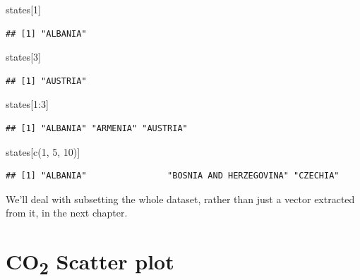 \documentclass[
]{book}
\newenvironment{Shaded}{\begin{snugshade}}{\end{snugshade}}
\newcommand{\DecValTok}[1]{\textcolor[rgb]{0.00,0.00,0.81}{#1}}
\newcommand{\FunctionTok}[1]{\textcolor[rgb]{0.00,0.00,0.00}{#1}}
\newcommand{\NormalTok}[1]{#1}
\newcommand{\SpecialCharTok}[1]{\textcolor[rgb]{0.00,0.00,0.00}{#1}}
\begin{document}
\begin{Shaded}
\begin{Highlighting}[]
\NormalTok{states[}\DecValTok{1}\NormalTok{]}
\end{Highlighting}
\end{Shaded}

\begin{verbatim}
## [1] "ALBANIA"
\end{verbatim}

\begin{Shaded}
\begin{Highlighting}[]
\NormalTok{states[}\DecValTok{3}\NormalTok{]}
\end{Highlighting}
\end{Shaded}

\begin{verbatim}
## [1] "AUSTRIA"
\end{verbatim}

\begin{Shaded}
\begin{Highlighting}[]
\NormalTok{states[}\DecValTok{1}\SpecialCharTok{:}\DecValTok{3}\NormalTok{]}
\end{Highlighting}
\end{Shaded}

\begin{verbatim}
## [1] "ALBANIA" "ARMENIA" "AUSTRIA"
\end{verbatim}

\begin{Shaded}
\begin{Highlighting}[]
\NormalTok{states[}\FunctionTok{c}\NormalTok{(}\DecValTok{1}\NormalTok{, }\DecValTok{5}\NormalTok{, }\DecValTok{10}\NormalTok{)]}
\end{Highlighting}
\end{Shaded}

\begin{verbatim}
## [1] "ALBANIA"                "BOSNIA AND HERZEGOVINA" "CZECHIA"
\end{verbatim}

We'll deal with subsetting the whole dataset, rather than just a vector extracted from it, in the next chapter.

\hypertarget{co2-scatter-plot}{%
\section{\texorpdfstring{CO\textsubscript{2} Scatter plot}{CO2 Scatter plot}}\label{co2-scatter-plot}}
\end{document}
